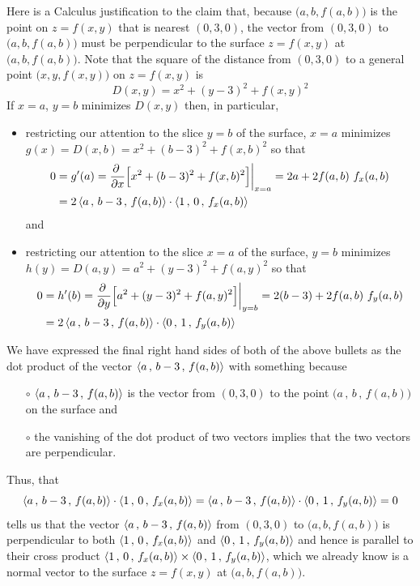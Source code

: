 \begin{eg}[Optional]
{Here is a Calculus justification to the claim that, because 
$\big(a,b,f(a,b)\big)$ is the point on $z=f(x,y)$ that is nearest 
$(0,3,0)$, the vector from $(0,3,0)$ to $\big(a,b,f(a,b)\big)$ 
must be perpendicular to the surface $z=f(x,y)$ at $\big(a,b,f(a,b)\big)$. 
}%
Note that the square of the distance from $(0,3,0)$ to a general point
$\big(x,y,f(x,y)\big)$ on $z=f(x,y)$ is
\begin{equation*}
D(x,y) = x^2 + (y-3)^2 +f(x,y)^2
\end{equation*}
If $x=a$, $y=b$ minimizes $D(x,y)$ then, in particular, 
\begin{itemize}
\item
  restricting our attention to the slice $y=b$ of the surface,
  $x=a$ minimizes $g(x) = D(x,b) =x^2 + (b-3)^2 +f(x,b)^2$ so that
  \begin{align*}
    0 &= g'(a) =\pdiff{}{x}\Big[x^2 + (b-3)^2 +f(x,b)^2\Big]\bigg|_{x=a}
       =2a +2 f(a,b)\ f_x(a,b) \\
      &=2 \llt a\,,\,b-3\,,\, f(a,b)\rgt\cdot\llt 1\,,\,0\,,\, f_x(a,b)\rgt
  \end{align*}
  and
\item
  restricting our attention to the slice $x=a$ of the surface,
  $y=b$ minimizes $h(y) = D(a,y) =a^2 + (y-3)^2 +f(a,y)^2$ so that
  \begin{align*}
    0 &= h'(b) =\pdiff{}{y}\Big[a^2 + (y-3)^2 +f(a,y)^2\Big]\bigg|_{y=b}
       =2 (b-3) +2 f(a,b)\ f_y(a,b) \\
      &=2 \llt a\,,\,b-3\,,\, f(a,b)\rgt\cdot\llt 0\,,\,1\,,\, f_y(a,b)\rgt
  \end{align*}

\end{itemize}
We have expressed the final right hand sides of both of the above bullets
as the dot product of the vector $\left< a\,,\,b-3\,,\, f(a,b)\right>$
with something because
\begin{itemize}\itemsep1pt \parskip0pt 
\item[$\circ$] 
$\left< a\,,\,b-3\,,\, f(a,b)\right>$ is the vector from $(0,3,0)$
to the point $(a\,,\,b\,,\, f(a,b)\big)$ on the surface and
\item[$\circ$] the vanishing of the dot product of two vectors
implies that the two vectors are perpendicular.
\end{itemize}
Thus, that
\begin{equation*}
\left< a\,,\,b-3\,,\, f(a,b)\right>\cdot\left< 1\,,\,0\,,\, f_x(a,b)\right>
=\left< a\,,\,b-3\,,\, f(a,b)\right>\cdot\left< 0\,,\,1\,,\, f_y(a,b)\right>
=0
\end{equation*}
 tells us that the vector $\left< a\,,\,b-3\,,\, f(a,b)\right>$
from $(0,3,0)$ to $\big(a,b,f(a,b)\big)$ is perpendicular to both 
$\left< 1\,,\,0\,,\, f_x(a,b)\right>$ and $\left< 0\,,\,1\,,\, f_y(a,b)\right>$
and hence is parallel to their cross product
$\left< 1\,,\, 0\,,\, f_x(a,b)\right>\times\left< 0\,,\, 1\,,\, f_y(a,b)\right>$,
which we already know is a normal vector to the surface $z=f(x,y)$ at 
 $\big(a,b,f(a,b)\big)$. 


\end{eg}
